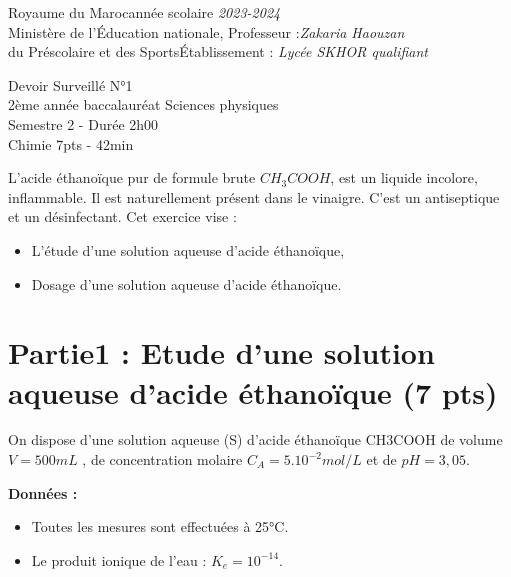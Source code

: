 \documentclass[12pt]{article}
\newcommand\headerMe[2]{\noindent{}#1\hfill#2}
\begin{document}
\headerMe{Royaume du Maroc}{année scolaire \emph{2023-2024}}\\
\headerMe{Ministère de l'Éducation nationale, }{  Professeur :\emph{Zakaria Haouzan}}\\
\headerMe{du Préscolaire et des Sports}{Établissement : \emph{Lycée SKHOR qualifiant}}\\
\vspace{-1cm}
\begin{center}
Devoir Surveillé  N°1 \\
    2ème année baccalauréat Sciences physiques\\
Semestre 2 - Durée 2h00
\\
    \vspace{.2cm}
\hrulefill
\Large{Chimie 7pts - 42min}
\hrulefill\\

\end{center}

L’acide éthanoïque pur de formule brute $CH_3COOH$, est un liquide incolore,
inflammable. Il est naturellement présent dans le vinaigre. C’est un antiseptique et un
désinfectant.
Cet exercice vise :
\begin{itemize}
	\item  L’étude d’une solution aqueuse d’acide éthanoïque,
	\item  Dosage d’une solution aqueuse d’acide éthanoïque.
\end{itemize}
 \section*{Partie1 : Etude d’une solution aqueuse d’acide éthanoïque  \dotfill(7 pts) }

On dispose d’une solution aqueuse (S) d’acide éthanoïque CH3COOH de volume
$V= 500mL$ , de concentration molaire $C_A = 5.10^{-2} mol/L$ et de $pH=3,05$.

\textbf{Données : } 
\begin{itemize}
	\item Toutes les mesures sont effectuées à 25°C.
	\item Le produit ionique de l’eau : $K_e = 10^{-14}$.
\end{itemize}
\end{document}
